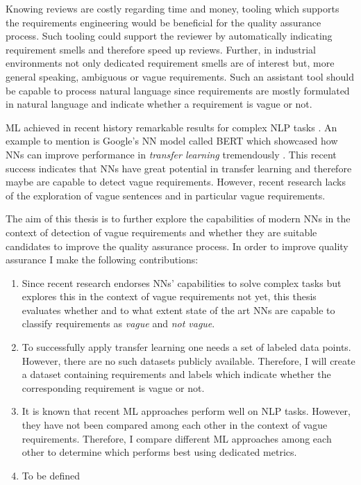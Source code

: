 Knowing reviews are costly regarding time and money, tooling which supports the requirements engineering would be beneficial for the quality assurance process.
Such tooling could support the reviewer by automatically indicating requirement smells and therefore speed up reviews.
Further, in industrial environments not only dedicated requirement smells are of interest but, more general speaking, ambiguous or vague requirements.
Such an assistant tool should be capable to process natural language since requirements are mostly formulated in natural language \parencite{Mich:2004} and indicate whether a requirement is vague or not.

\Ac{ML} achieved in recent history remarkable results for complex \ac{NLP} tasks \parencite{Khan:2016}.
An example to mention is Google's \ac{NN} model called BERT which showcased how \acp{NN} can improve performance in \textit{transfer learning} tremendously \parencite{Devlin:2018}.
This recent success indicates that \acp{NN} have great potential in transfer learning and therefore maybe are capable to detect vague requirements.
However, recent research lacks of the exploration of vague sentences and in particular vague requirements.

The aim of this thesis is to further explore the capabilities of modern \acp{NN} in the context of detection of vague requirements and whether they are suitable candidates to improve the quality assurance process.
In order to improve quality assurance I make the following contributions:
\begin{enumerate}
    \item Since recent research endorses \acp{NN}' capabilities to solve complex tasks but explores this in the context of vague requirements not yet, this thesis evaluates whether and to what extent state of the art \acp{NN} are capable to classify requirements as \textit{vague} and \textit{not vague}.
    \item To successfully apply transfer learning one needs a set of labeled data points. However, there are no such datasets publicly available.
        Therefore, I will create a dataset containing requirements and labels which indicate whether the corresponding requirement is vague or not.
    \item It is known that recent \ac{ML} approaches perform well on \ac{NLP} tasks.
        However, they have not been compared among each other in the context of vague requirements.
        Therefore, I compare different \ac{ML} approaches among each other to determine which performs best using dedicated metrics.
    \item To be defined %
\end{enumerate}
